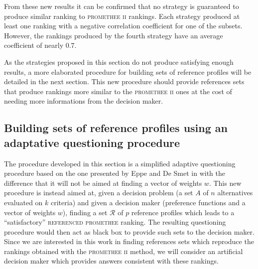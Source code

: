 From these new results it can be confirmed that no strategy is guaranteed to produce similar ranking to \textsc{promethee ii} rankings. Each strategy produced at least one ranking with a negative correlation coefficient for one of the subsets.
However, the rankings produced by the fourth strategy have an average coefficient of nearly $0.7$.

As the strategies proposed in this section do not produce satisfying enough results, a more elaborated procedure for building sets of reference profiles will be detailed in the next section.
This new procedure should provide references sets that produce rankings more similar to the \textsc{promethee ii} ones at the cost of needing more informations from the decision maker.

\subsection{Building sets of reference profiles using an adaptative questioning procedure}
\label{sec:questioning_procedure}

The procedure developed in this section is a simplified adaptive questioning procedure based on the one presented by Eppe and De Smet in \cite{eppe2014adaptive} with the difference that it will not be aimed at finding a vector of weights $w$.
This new procedure is instead aimed at, given a decision problem (a set $A$ of $n$ alternatives evaluated on $k$ criteria) and given a decision maker (preference functions and a vector of weights $w$), finding a set $\mathcal{R}$ of $p$ reference profiles which leads to a ``satisfactory'' \textsc{referenced promethee} ranking.
The resulting questioning procedure would then act as black box to provide such sets to the decision maker.
\newpage
Since we are interested in this work in finding references sets which reproduce the rankings obtained with the \textsc{promethee ii} method, we will consider an artificial decision maker which provides answers consistent with these rankings.



